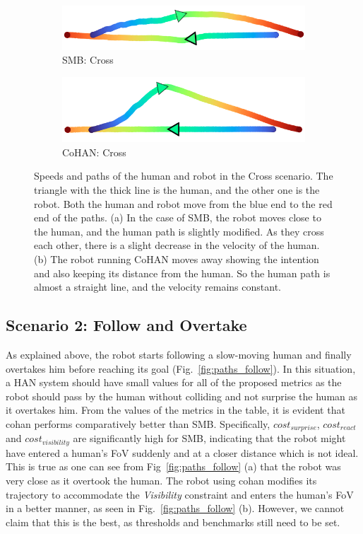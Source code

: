 \begin{figure}[h!]
\vspace{0.15cm}
\begin{subfigure}{.45\columnwidth}
  \includegraphics[width=\textwidth]{images/chapter6/smb/cross.png}
  \caption{SMB: Cross}
\end{subfigure}
\hspace{0.15cm}
\begin{subfigure}{.45\columnwidth}
  \includegraphics[width=\textwidth]{images/chapter6/cohan/cross.png}
  \caption{CoHAN: Cross}
\end{subfigure}
\caption{Speeds and paths of the human and robot in the Cross scenario. The triangle with the thick line is the human, and the other one is the robot. Both the human and robot move from the blue end to the red end of the paths. (a) In the case of SMB, the robot moves close to the human, and the human path is slightly modified. As they cross each other, there is a slight decrease in the velocity of the human. (b) The robot running CoHAN moves away showing the intention and also keeping its distance from the human. So the human path is almost a straight line, and the velocity remains constant.}
\label{fig:paths_cross}
\end{figure} 

\subsection{Scenario 2: Follow and Overtake}
As explained above, the robot starts following a slow-moving human and finally overtakes him before reaching its goal (Fig.~\ref{fig:paths_follow}). In this situation, a HAN system should have small values for all of the proposed metrics as the robot should pass by the human without colliding and not surprise the human as it overtakes him. From the values of the metrics in the table, it is evident that \acrshort{cohan} performs comparatively better than SMB. Specifically, $cost_{surprise}$, $cost_{react}$ and $cost_{visibility}$ are significantly high for SMB, indicating that the robot might have entered a human's FoV suddenly and at a closer distance which is not ideal. This is true as one can see from Fig~\ref{fig:paths_follow} (a) that the robot was very close as it overtook the human. The robot using \acrshort{cohan} modifies its trajectory to accommodate the \textit{Visibility} constraint and enters the human's FoV in a better manner, as seen in Fig.~\ref{fig:paths_follow} (b). However, we cannot claim that this is the best, as thresholds and benchmarks still need to be set. 

